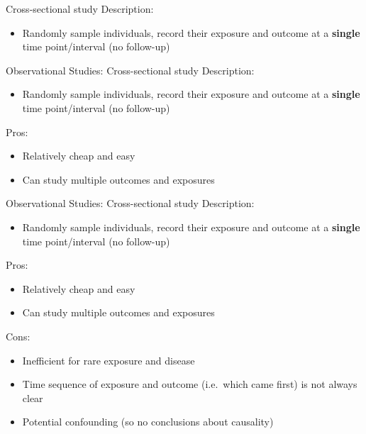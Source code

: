 \documentclass[
  ignorenonframetext,
]{beamer}
\providecommand{\tightlist}{%
  \setlength{\itemsep}{0pt}\setlength{\parskip}{0pt}}
\begin{document}
\begin{frame}{Cross-sectional study}
\protect\hypertarget{cross-sectional-study}{}
Description:

\begin{itemize}
\tightlist
\item
  Randomly sample individuals, record their exposure and outcome at a
  \textbf{single} time point/interval (no follow-up)
\end{itemize}
\end{frame}

\begin{frame}{Observational Studies: Cross-sectional study}
\protect\hypertarget{observational-studies-cross-sectional-study}{}
Description:

\begin{itemize}
\tightlist
\item
  Randomly sample individuals, record their exposure and outcome at a
  \textbf{single} time point/interval (no follow-up)
\end{itemize}

Pros:

\begin{itemize}
\tightlist
\item
  Relatively cheap and easy
\item
  Can study multiple outcomes and exposures
\end{itemize}
\end{frame}

\begin{frame}{Observational Studies: Cross-sectional study}
\protect\hypertarget{observational-studies-cross-sectional-study-1}{}
Description:

\begin{itemize}
\tightlist
\item
  Randomly sample individuals, record their exposure and outcome at a
  \textbf{single} time point/interval (no follow-up)
\end{itemize}

Pros:

\begin{itemize}
\tightlist
\item
  Relatively cheap and easy
\item
  Can study multiple outcomes and exposures
\end{itemize}

Cons:

\begin{itemize}
\tightlist
\item
  Inefficient for rare exposure and disease
\item
  Time sequence of exposure and outcome (i.e.~which came first) is not
  always clear
\item
  Potential confounding (so no conclusions about causality)
\end{itemize}
\end{frame}
\end{document}
